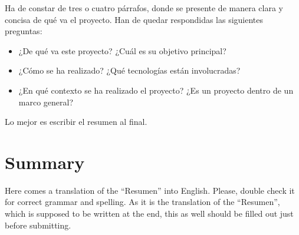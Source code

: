 \documentclass[a4paper, 12pt]{book}
\begin{document}
Ha de constar de tres o cuatro párrafos, donde se presente de manera clara y concisa de qué va el proyecto. Han
de quedar respondidas las siguientes preguntas:

\begin{itemize}
  \item ¿De qué va este proyecto? ¿Cuál es su objetivo principal?
  \item ¿Cómo se ha realizado? ¿Qué tecnologías están involucradas?
  \item ¿En qué contexto se ha realizado el proyecto? ¿Es un proyecto
dentro de un marco general?
\end{itemize}

Lo mejor es escribir el resumen al final.


\chapter*{Summary}

Here comes a translation of the ``Resumen'' into English. Please, double check
it for correct grammar and spelling. As it is the translation of the ``Resumen'',
which is supposed to be written at the end, this as well should be filled out
just before submitting.




\tableofcontents 
\cleardoublepage
\listoffigures %


\end{document}
